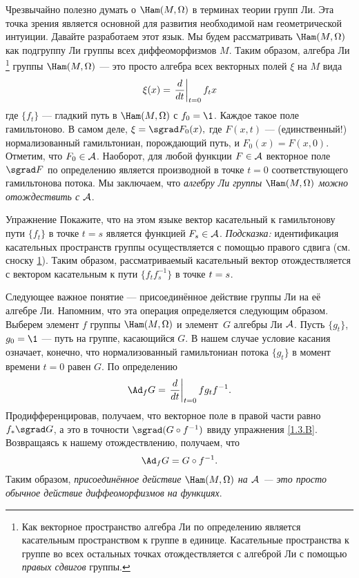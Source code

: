 {\sloppy 

Чрезвычайно полезно думать о $\Ham (M, \Omega)$ в терминах теории групп Ли.
Эта точка зрения является основной для развития необходимой нам геометрической интуиции.
Давайте разработаем этот язык.
Мы будем рассматривать $\Ham (M, \Omega)$ как подгруппу Ли группы всех диффеоморфизмов $M$.
Таким образом, алгебра Ли%
\footnote{\label{footnote} Как векторное пространство алгебра Ли по определению является касательным пространством к группе в единице.
Касательные пространства к группе во всех остальных точках отождествляется с алгеброй Ли с помощью {}\emph{правых сдвигов} группы.}
группы $\Ham (M, \Omega)$ — это просто алгебра всех векторных полей $\xi$ на $M$ вида 
\[\xi(x)=\left.\frac{d}{d t}\right|_{t=0}f_tx\]
где $\{f_t\}$ — гладкий путь в $\Ham (M, \Omega)$ с $f_0 = \1$.
Каждое такое поле гамильтоново.
В самом деле, $\xi = \sgrad F_0 (x),$ где $F (x, t)$ — (единственный!) нормализованный гамильтониан, порождающий путь, и $F_0 (x) = F (x, 0)$.
Отметим, что $F_0 \in \mathcal{A}$.
Наоборот, для любой функции $F \in \mathcal{A}$ векторное поле $\sgrad F$ по определению является производной в точке $t = 0$ соответствующего гамильтонова потока.
Мы заключаем, что \emph{алгебру Ли группы $\Ham (M, \Omega)$ можно отождествить с $\mathcal{A}$}.

\begin{ex}{Упражнение}\label{1.4.G}
Покажите, что на этом языке вектор касательный к гамильтонову пути $\{f_t\}$ в точке $t = s$ является функцией $F_s \in \mathcal{A}$.
\emph{Подсказка:} идентификация касательных пространств группы осуществляется с помощью правого сдвига (см. сноску \ref{footnote}).
Таким образом, рассматриваемый касательный вектор отождествляется с
вектором касательным к пути $\{f_tf_s^{-1}\}$ в точке $t \z= s$.
\end{ex}

Следующее важное понятие — присоединённое действие группы Ли на её алгебре Ли.
Напомним, что эта операция определяется следующим образом.
Выберем элемент $f$ группы $\Ham (M, \Omega)$ и элемент~$G$ алгебры Ли $\mathcal{A}$.
Пусть $\{g_t\}$, $g_0 = \1$ — путь на группе, касающийся $G$.
В нашем случае условие касания означает, конечно, что нормализованный гамильтониан потока $\{g_t\}$ в момент времени $t = 0$ равен $G$.
По определению 
\[\Ad_f G = \left.\frac{\d}{\d t}\right|_{t=0} fg_tf^{-1}.\]
Продифференцировав, получаем, что векторное поле в правой части равно $f_\ast \sgrad G$, а это в точности $\sgrad  (G\circ f^{-1})$ ввиду упражнения \ref{1.3.B}.
Возвращаясь к нашему отождествлению, получаем, что 
\[\Ad_f G = G \circ f^{-1}.\]
Таким образом, \emph{присоединённое действие $\Ham (M, \Omega)$ на $\mathcal{A}$ — это просто обычное действие диффеоморфизмов на функциях}.

}
